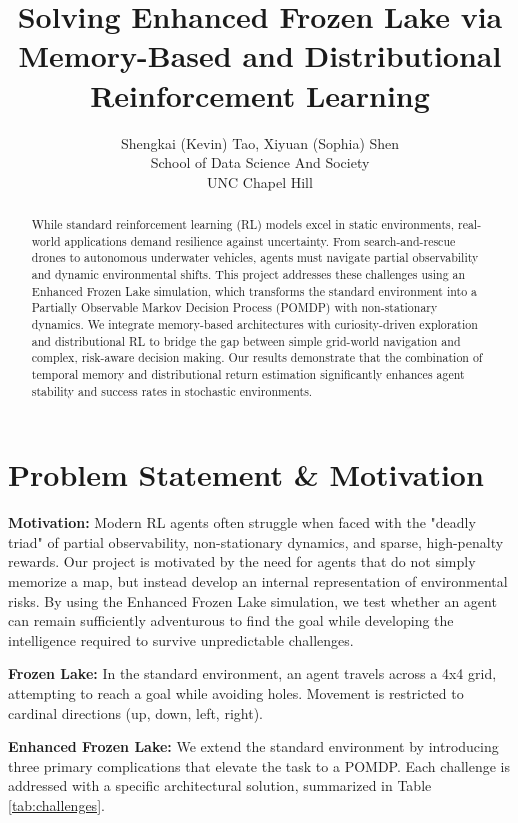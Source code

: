 \documentclass{article}
\title{Solving Enhanced Frozen Lake via Memory-Based and Distributional Reinforcement Learning}
\author{%
  Shengkai (Kevin) Tao, Xiyuan (Sophia) Shen \\
  School of Data Science And Society \\
  UNC Chapel Hill \\
}
\begin{document}
\maketitle

\begin{abstract}
While standard reinforcement learning (RL) models excel in static environments, real-world applications demand resilience against uncertainty. From search-and-rescue drones to autonomous underwater vehicles, agents must navigate partial observability and dynamic environmental shifts. This project addresses these challenges using an Enhanced Frozen Lake simulation, which transforms the standard environment into a Partially Observable Markov Decision Process (POMDP) with non-stationary dynamics. We integrate memory-based architectures with curiosity-driven exploration and distributional RL to bridge the gap between simple grid-world navigation and complex, risk-aware decision making. Our results demonstrate that the combination of temporal memory and distributional return estimation significantly enhances agent stability and success rates in stochastic environments.
\end{abstract}

\section{Problem Statement \& Motivation}

\textbf{Motivation:} Modern RL agents often struggle when faced with the "deadly triad" of partial observability, non-stationary dynamics, and sparse, high-penalty rewards. Our project is motivated by the need for agents that do not simply memorize a map, but instead develop an internal representation of environmental risks. By using the Enhanced Frozen Lake simulation, we test whether an agent can remain sufficiently adventurous to find the goal while developing the intelligence required to survive unpredictable challenges.

\textbf{Frozen Lake:} In the standard environment, an agent travels across a 4x4 grid, attempting to reach a goal while avoiding holes. Movement is restricted to cardinal directions (up, down, left, right).

\textbf{Enhanced Frozen Lake:} We extend the standard environment by introducing three primary complications that elevate the task to a POMDP. Each challenge is addressed with a specific architectural solution, summarized in Table \ref{tab:challenges}.
\end{document}
